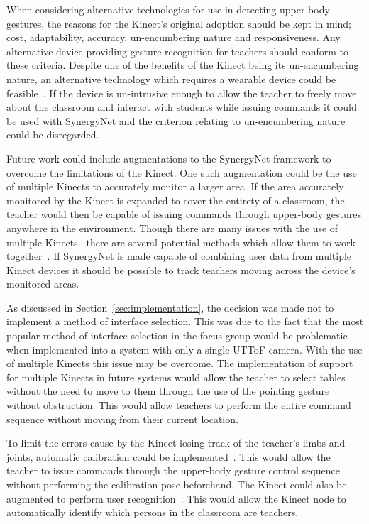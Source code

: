\documentclass[manuscript, review, screen]{acmart}
\begin{document}
When considering alternative technologies for use in detecting upper-body gestures, the reasons for the Kinect's original adoption should be kept in mind; cost, adaptability, accuracy, un-encumbering nature and responsiveness.
Any alternative device providing gesture recognition for teachers should conform to these criteria.
Despite one of the benefits of the Kinect being its un-encumbering nature, an alternative technology which requires a wearable device could be feasible~\cite{Rekimotoa,Zhu2011}.
If the device is un-intrusive enough to allow the teacher to freely move about the classroom and interact with students while issuing commands it could be used with SynergyNet and the criterion relating to un-encumbering nature could be disregarded. 

Future work could include augmentations to the SynergyNet framework to overcome the limitations of the Kinect.
One such augmentation could be the use of multiple Kinects to accurately monitor a larger area.
If the area accurately monitored by the Kinect is expanded to cover the entirety of a classroom, the teacher would then be capable of issuing commands through upper-body gestures anywhere in the environment.
Though there are many issues with the use of multiple Kinects~\cite{Maimone2012,Schroder2011} there are several potential methods which allow them to work together~\cite{Wang2012}.
If SynergyNet is made capable of combining user data from multiple Kinect devices it should be possible to track teachers moving across the device's monitored areas.

As discussed in Section~\ref{sec:implementation}, the decision was made not to implement a method of interface selection.
This was due to the fact that the most popular method of interface selection in the focus group would be problematic when implemented into a system with only a single \ac{UTToF} camera.
With the use of multiple Kinects this issue may be overcome. 
The implementation of support for multiple Kinects in future systems would allow the teacher to select tables without the need to move to them through the use of the pointing gesture without obstruction.
This would allow teachers to perform the entire command sequence without moving from their current location.

To limit the errors cause by the Kinect losing track of the teacher's limbs and joints, automatic calibration could be implemented~\cite{Bellmore2011}.
This would allow the teacher to issue commands through the upper-body gesture control sequence without performing the calibration pose beforehand.
The Kinect could also be augmented to perform user recognition~\cite{Leyvand2011}.
This would allow the Kinect node to automatically identify which persons in the classroom are teachers.
\end{document}
